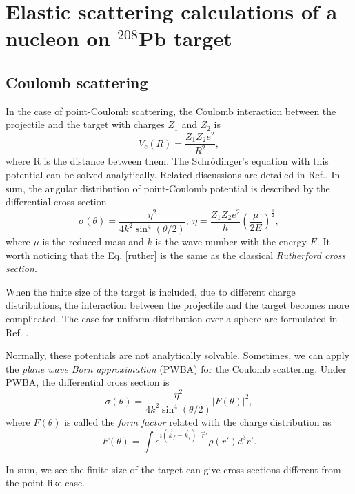 \section{Elastic scattering calculations of a nucleon on $^{208}$Pb target} \label{part1}
\subsection{Coulomb scattering}
	In the case of point-Coulomb scattering, the Coulomb interaction between the projectile and the target with charges $Z_1$ and $Z_2$ is 
	\begin{equation}
		V_c(R)=\frac{Z_1Z_2e^2}{R^2},
	\end{equation}
	where R is the distance between them. The Schr\"{o}dinger's equation with this potential can be solved analytically. Related discussions are detailed in Ref.\cite{thompson2009nuclear}. In sum, the angular distribution of point-Coulomb potential is described by the differential cross section
	\begin{equation}\label{ruther}
		\sigma(\theta)=\frac{\eta^2}{4k^2\sin^4(\theta/2)};\ \eta=\frac{Z_1Z_2e^2}{\hbar}\left(\frac{\mu}{2E}\right)^{\frac{1}{2}},
	\end{equation} 
	where $\mu$ is the reduced mass and $k$ is the wave number with the energy $E$. It worth noticing that the Eq. \ref{ruther} is the same as the classical \emph{Rutherford cross section}.
	
	When the finite size of the target is included, due to different charge distributions, the interaction between the projectile and the target becomes more complicated. The case for uniform distribution over a sphere are formulated in Ref.  \cite{thompson2009nuclear}.
	
  		Normally, these potentials are not analytically solvable. Sometimes, we can apply the \emph{plane wave Born approximation} (PWBA) for the Coulomb scattering. Under PWBA, the differential cross section is 
  	\begin{equation}\label{ruther}
	\sigma(\theta)=\frac{\eta^2}{4k^2\sin^4(\theta/2)}\left|F(\theta)\right|^2,\end{equation}
	where $F(\theta)$ is called the \emph{form factor} related with the charge distribution as
	\begin{equation}
	F(\theta) = \int e^{i(\vec{k}_f-\vec{k}_i)\cdot\vec{r}'}\rho(r')d^3r'.
	\end{equation}
	
  		In sum, we see the finite size of the target can give cross sections different from the point-like case.
